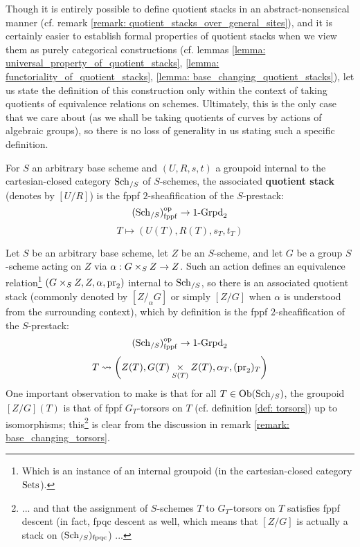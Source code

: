             Though it is entirely possible to define quotient stacks in an abstract-nonsensical manner (cf. remark \ref{remark: quotient_stacks_over_general_sites}), and it is certainly easier to establish formal properties of quotient stacks when we view them as purely categorical constructions (cf. lemmas \ref{lemma: universal_property_of_quotient_stacks}, \ref{lemma: functoriality_of_quotient_stacks}, \ref{lemma: base_changing_quotient_stacks}), let us state the definition of this construction only within the context of taking quotients of equivalence relations on schemes. Ultimately, this is the only case that we care about (as we shall be taking quotients of curves by actions of algebraic groups), so there is no loss of generality in us stating such a specific definition.
            \begin{definition} \label{def: quotient_stacks}
                For $S$ an arbitrary base scheme and $(U, R, s, t)$ a groupoid internal to the cartesian-closed category $\mathrm{Sch}_{/S}$ of $S$-schemes, the associated \textbf{quotient stack} (denotes by $[U/R]$) is the fppf $2$-sheafification of the $S$-prestack:
                    $$(\mathrm{Sch}_{/S})_{\mathrm{fppf}}^{\mathrm{op}} \to 1\text{-}\mathrm{Grpd}_2$$
                    $$T \mapsto (U(T), R(T), s_T, t_T)$$
            \end{definition}
            \begin{example} \label{example: quotient_stacks_associated_to_group_scheme_actions}
                Let $S$ be an arbitrary base scheme, let $Z$ be an $S$-scheme, and let $G$ be a group $S$-scheme acting on $Z$ via $\alpha: G \x_S Z \to Z$. Such an action defines an equivalence relation\footnote{Which is an instance of an internal groupoid (in the cartesian-closed category $\mathrm{Sets}$).} $(G \x_S Z, Z, \alpha, \pr_2)$ internal to $\mathrm{Sch}_{/S}$, so there is an associated quotient stack (commonly denoted by $[Z/_{\alpha}G]$ or simply $[Z/G]$ when $\alpha$ is understood from the surrounding context), which by definition is the fppf $2$-sheafification of the $S$-prestack:
                    $$(\mathrm{Sch}_{/S})_{\mathrm{fppf}}^{\mathrm{op}} \to 1\text{-}\mathrm{Grpd}_2$$
                    $$T \mapsto \left(Z(T), G(T) \x_{S(T)} Z(T), \alpha_T, (\pr_2)_T\right)$$
                One important observation to make is that for all $T \in \mathrm{Ob}(\mathrm{Sch}_{/S})$, the groupoid $[Z/G](T)$ is that of fppf $G_T$-torsors on $T$ (cf. definition \ref{def: torsors}) up to isomorphisms; this\footnote{... and that the assignment of $S$-schemes $T$ to $G_T$-torsors on $T$ satisfies fppf descent (in fact, fpqc descent as well, which means that $[Z/G]$ is actually a stack on $(\mathrm{Sch}_{/S})_{\mathrm{fpqc}}$) ...} is clear from the discussion in remark \ref{remark: base_changing_torsors}. 
            \end{example}
